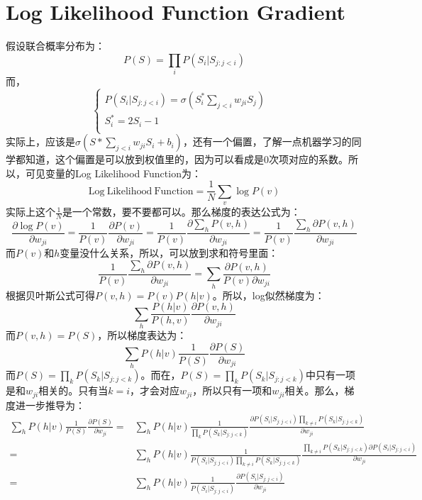 \documentclass[a4paper]{article}
\begin{document}
\section{Log Likelihood Function Gradient}
假设联合概率分布为：
\begin{equation}
    P(S) = \prod_i P(S_i|S_{j:j<i})
\end{equation}
而，
\begin{equation}
    \left\{
    \begin{array}{ll}
      P(S_i|S_{j:j<i}) = \sigma\left(S^\ast_i\sum_{j<i}w_{ji}S_j \right)& \\
      S^\ast_i = 2S_i -1 & \\
    \end{array}
    \right.
\end{equation}
实际上，应该是$\sigma\left(S\ast\sum_{j<i}w_{ji}S_i + b_i \right)$，还有一个偏置，了解一点机器学习的同学都知道，这个偏置是可以放到权值里的，因为可以看成是0次项对应的系数。所以，可见变量的Log Likelihood Function为：
\begin{equation}
    \mathrm{Log\ Likelihood\ Function} = \frac{1}{N} \sum_v \log P(v)
\end{equation}
实际上这个$\frac{1}{N}$是一个常数，要不要都可以。那么梯度的表达公式为：
\begin{equation}
    \frac{\partial \log P(v)}{\partial w_{ji}} = \frac{1}{P(v)} \frac{\partial P(v)}{\partial w_{ji}} = \frac{1}{P(v)} \frac{\partial \sum_h P(v,h)}{\partial w_{ji}} = \frac{1}{P(v)} \frac{\sum_h \partial P(v,h)}{\partial w_{ji}}
\end{equation}
而$P(v)$和$h$变量没什么关系，所以，可以放到求和符号里面：
\begin{equation}
    \frac{1}{P(v)} \frac{\sum_h \partial P(v,h)}{\partial w_{ji}} = \sum_h \frac{\partial P(v,h)}{P(v) \partial w_{ji}}
\end{equation}
根据贝叶斯公式可得$P(v,h) = P(v)P(h|v)$。所以，log似然梯度为：
\begin{equation}
     \sum_h \frac{P(h|v)}{P(h,v)} \frac{\partial P(v,h)}{\partial w_{ji}} 
\end{equation}
而$P(v,h) = P(S)$，所以梯度表达为：
\begin{equation}
    \sum_h P(h|v)\frac{1}{P(S)} \frac{\partial P(S)}{\partial w_{ji}} 
\end{equation}
而$P(S) = \prod_k P(S_k|S_{j:j<k})$。而在，$P(S) = \prod_k P(S_k|S_{j:j<k})$中只有一项是和$w_{ji}$相关的。只有当$k=i$，才会对应$w_{ji}$，所以只有一项和$w_{ji}$相关。那么，梯度进一步推导为：
\begin{equation}
\begin{split}
    \sum_h P(h|v)\frac{1}{P(S)} \frac{\partial P(S)}{\partial w_{ji}} = &  \sum_h P(h|v) \frac{1}{\prod_k P(S_k|S_{j:j<k})}\frac{\partial P(S_i|S_{j:j<i})  \prod_{k\neq i} P(S_k|S_{j:j<k})}{\partial w_{ji}} \\
    = & \sum_h P(h|v) \frac{1}{P(S_i|S_{j:j<i})  \prod_{k\neq i} P(S_k|S_{j:j<k})}\frac{\prod_{k\neq i} P(S_k|S_{j:j<k}) \partial P(S_i|S_{j:j<i})}{\partial w_{ji}} \\
    = & \sum_h P(h|v) \frac{1}{P(S_i|S_{j:j<i})}\frac{ \partial P(S_i|S_{j:j<i})}{\partial w_{ji}}
\end{split}
\end{equation}
\end{document}

